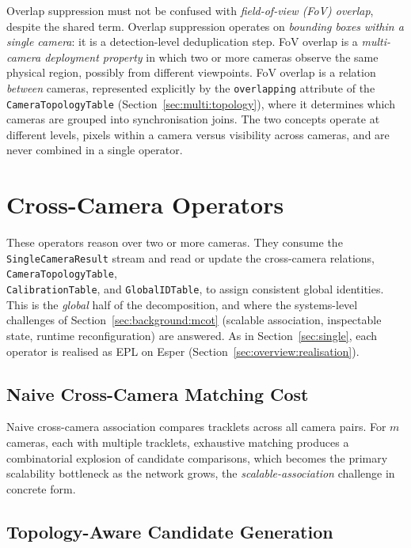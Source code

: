 \documentclass[5p,times]{elsarticle}
\begin{document}
Overlap suppression must not be confused with \emph{field-of-view (FoV) overlap}, despite the shared term. Overlap suppression operates on \emph{bounding boxes within a single camera}: it is a detection-level deduplication step. FoV overlap is a \emph{multi-camera deployment property} in which two or more cameras observe the same physical region, possibly from different viewpoints. FoV overlap is a relation \emph{between} cameras, represented explicitly by the \texttt{overlapping} attribute of the \\\texttt{CameraTopologyTable} (Section~\ref{sec:multi:topology}), where it determines which cameras are grouped into synchronisation joins. The two concepts operate at different levels, pixels within a camera versus visibility across cameras, and are never combined in a single operator.


\section{Cross-Camera Operators}
\label{sec:multi}

These operators reason over two or more cameras. They consume the \texttt{SingleCameraResult} stream and read or update the cross-camera relations, \texttt{CameraTopologyTable},\\ \texttt{CalibrationTable}, and \texttt{GlobalIDTable}, to assign consistent global identities. This is the \emph{global} half of the decomposition, and where the systems-level challenges of Section~\ref{sec:background:mcot} (scalable association, inspectable state, runtime reconfiguration) are answered. As in Section~\ref{sec:single}, each operator is realised as EPL on Esper (Section~\ref{sec:overview:realisation}).

\subsection{Naive Cross-Camera Matching Cost}
\label{sec:multi:naive}
Naive cross-camera association compares tracklets across all camera pairs. For $m$ cameras, each with multiple tracklets, exhaustive matching produces a combinatorial explosion of candidate comparisons, which becomes the primary scalability bottleneck as the network grows, the \emph{scalable-association} challenge in concrete form.

\subsection{Topology-Aware Candidate Generation}
\label{sec:multi:assoc}
\end{document}

